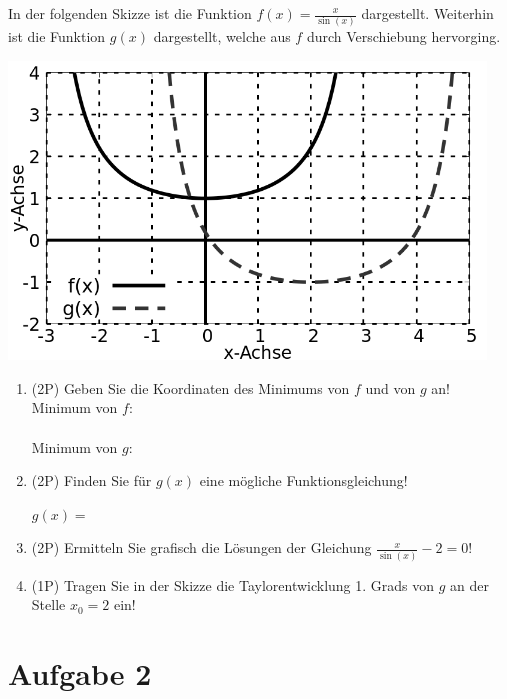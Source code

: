\documentclass[12pt]{article}
\begin{document}
In der folgenden Skizze ist die Funktion $f(x)=\frac{x}{\sin(x)}$ dargestellt. Weiterhin ist die Funktion $g(x)$ dargestellt, welche aus $f$ durch Verschiebung hervorging.

\begin{center}
\includegraphics[width=0.95\textwidth]{grid-trial.png}
\end{center}

\begin{enumerate}[label=(\alph*)]
\item (2P) Geben Sie die Koordinaten des Minimums von $f$ und von $g$ an!\\

Minimum von $f$:\\
\bigskip\\
Minimum von $g$:\\
\bigskip
\bigskip

\item (2P) Finden Sie für $g(x)$ eine mögliche Funktionsgleichung!

\bigskip
\bigskip

$g(x)=$

\bigskip
\bigskip
\bigskip

\item (2P) Ermitteln Sie grafisch die Lösungen der Gleichung $\frac{x}{\sin(x)}-2=0$!

\bigskip
\bigskip
\bigskip
\bigskip
\bigskip
\bigskip

\item (1P) Tragen Sie in der Skizze die Taylorentwicklung 1. Grads von $g$ an der Stelle $x_0=2$ ein!

\end {enumerate}

\newpage
\section* {Aufgabe 2}
\end{document}
